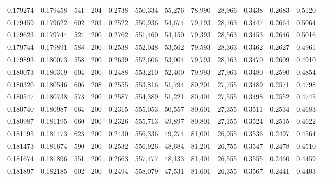 \begin{tabular}{rrrrrrrrrrrrr}
0.179274 & 0.179458 &   541 & 204 &                                     0.2738 & 550,334 &  55,276 &  78,990 &  28,966 & 0.3438 & 0.2683 & 0.5120 \\
0.179459 & 0.179622 &   602 & 203 &                                     0.2522 & 550,936 &  54,674 &  79,193 &  28,763 & 0.3447 & 0.2664 & 0.5064 \\
0.179623 & 0.179744 &   524 & 200 &                                     0.2762 & 551,460 &  54,150 &  79,393 &  28,563 & 0.3453 & 0.2646 & 0.5016 \\
0.179744 & 0.179891 &   588 & 200 &                                     0.2538 & 552,048 &  53,562 &  79,593 &  28,363 & 0.3462 & 0.2627 & 0.4961 \\
0.179893 & 0.180073 &   558 & 200 &                                     0.2639 & 552,606 &  53,004 &  79,793 &  28,163 & 0.3470 & 0.2609 & 0.4910 \\
0.180073 & 0.180319 &   604 & 200 &                                     0.2488 & 553,210 &  52,400 &  79,993 &  27,963 & 0.3480 & 0.2590 & 0.4854 \\
0.180320 & 0.180546 &   606 & 208 &                                     0.2555 & 553,816 &  51,794 &  80,201 &  27,755 & 0.3489 & 0.2571 & 0.4798 \\
0.180547 & 0.180738 &   573 & 200 &                                     0.2587 & 554,389 &  51,221 &  80,401 &  27,555 & 0.3498 & 0.2552 & 0.4745 \\
0.180740 & 0.180987 &   664 & 200 &                                     0.2315 & 555,053 &  50,557 &  80,601 &  27,355 & 0.3511 & 0.2534 & 0.4683 \\
0.180987 & 0.181195 &   660 & 200 &                                     0.2326 & 555,713 &  49,897 &  80,801 &  27,155 & 0.3524 & 0.2515 & 0.4622 \\
0.181195 & 0.181473 &   623 & 200 &                                     0.2430 & 556,336 &  49,274 &  81,001 &  26,955 & 0.3536 & 0.2497 & 0.4564 \\
0.181473 & 0.181674 &   590 & 200 &                                     0.2532 & 556,926 &  48,684 &  81,201 &  26,755 & 0.3547 & 0.2478 & 0.4510 \\
0.181674 & 0.181896 &   551 & 200 &                                     0.2663 & 557,477 &  48,133 &  81,401 &  26,555 & 0.3555 & 0.2460 & 0.4459 \\
0.181897 & 0.182185 &   602 & 200 &                                     0.2494 & 558,079 &  47,531 &  81,601 &  26,355 & 0.3567 & 0.2441 & 0.4403 \\

\end{tabular}
